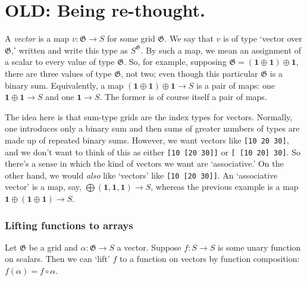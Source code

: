 \documentclass[11pt]{article}
\newcommand{\gr}[1]{\mathfrak{#1}}
\newcommand{\GG}{\gr{G}}
\newcommand{\unit}{\mathbf{1}}
\begin{document}
                                                                                                   







\section{OLD: Being re-thought.}
\label{sec:org0f361a3}


A \emph{vector} is a map \(v : \GG\to S\) for some grid \(\GG\). We say that \(v\) is of
type ‘vector over \(\GG\),’ written and write this type as \(S^\GG\). By such a map,
we mean an assignment of a scalar to every value of type \(\GG\). So, for example,
supposing \(\GG = (\unit\oplus\unit) \oplus \unit\), there are three values of
type \(\GG\), not two; even though this particular \(\GG\) is a binary
sum. Equivalently, a map \((\unit\oplus\unit) \oplus \unit\to S\) is a pair of
maps: one \(\unit\oplus\unit\to S\) and one \(\unit\to S\). The former is of course
itself a pair of maps.

The idea here is that sum-type grids are the index types for vectors. Normally,
one introduces only a binary sum and then sums of greater numbers of types are
made up of repeated binary sums. However, we want vectors like \texttt{[10 20 30]}, and
we don't want to think of this as either \texttt{[10 [20 30]]} or \texttt{[ [10 20] 30]}.  So
there's a sense in which the kind of vectors we want are ‘associative.’ On the
other hand, we would \emph{also} like ‘vectors’ like \texttt{[10 [20 30]]}. An ‘associative
vector’ is a map, say, \(\bigoplus(\unit, \unit, \unit)\to S\), whereas the
previous example is a map \(\unit\oplus (\unit\oplus \unit)\to S\).

\subsubsection{Lifting functions to arrays}
\label{sec:orgc0391ab}

Let \(\GG\) be a grid and \(\alpha:\GG\to S\) a vector. Suppose \(f:S\to S\) is some
unary function on scalars. Then we can ‘lift’ \(f\) to a function on vectors by
function composition: \(f(\alpha) = f\circ\alpha\).
\end{document}
